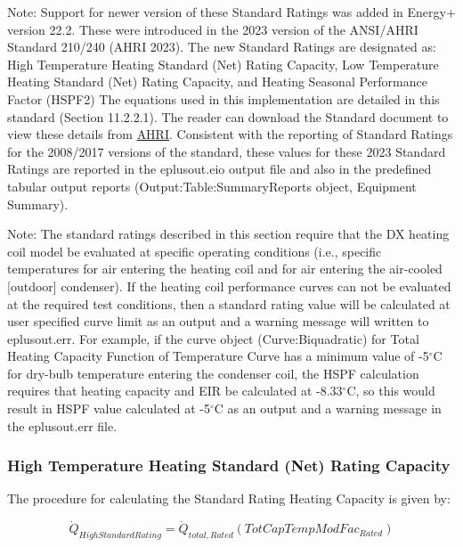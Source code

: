 Note: Support for newer version of these Standard Ratings was added in Energy+ version 22.2.  These were introduced in the 2023 version of the ANSI/AHRI Standard 210/240 (AHRI 2023).  The new Standard Ratings are designated as: High Temperature Heating Standard (Net) Rating Capacity, Low Temperature Heating Standard (Net) Rating Capacity, and Heating Seasonal Performance Factor (HSPF2)
The equations used in this implementation are detailed in this standard (Section 11.2.2.1).  The reader can download the Standard document to view these details from \href{https://www.ahrinet.org/App_Content/ahri/files/STANDARDS/AHRI/AHRI_Standard_210-240_2023.pdf}{AHRI}.
Consistent with the reporting of Standard Ratings for the 2008/2017 versions of the standard, these values for these 2023 Standard Ratings are reported in the eplusout.eio output file and also in the predefined tabular output reports (Output:Table:SummaryReports object, Equipment Summary).

Note: The standard ratings described in this section require that the DX heating coil model be evaluated at specific operating conditions (i.e., specific temperatures for air entering the heating coil and for air entering the air-cooled {[}outdoor{]} condenser). If the heating coil performance curves can not be evaluated at the required test conditions, then a standard rating value will be calculated at user specified curve limit as an output and a warning message will written to eplusout.err. For example, if the curve object (Curve:Biquadratic) for Total Heating Capacity Function of Temperature Curve has a minimum value of -5\(^{\circ}\)C for dry-bulb temperature entering the condenser coil, the HSPF calculation requires that heating capacity and EIR be calculated at -8.33\(^{\circ}\)C, so this would result in HSPF value calculated at -5\(^{\circ}\)C as an output and a warning message in the eplusout.err file.

\subsubsection{High Temperature Heating Standard (Net) Rating Capacity}\label{high-temperature-heating-standard-net-rating-capacity}

The procedure for calculating the Standard Rating Heating Capacity is given by:

\begin{equation}
{\dot Q_{HighStandardRating}} = {\dot Q_{total,Rated}}\left( {TotCapTempModFa{c_{Rated}}} \right)
\end{equation}

